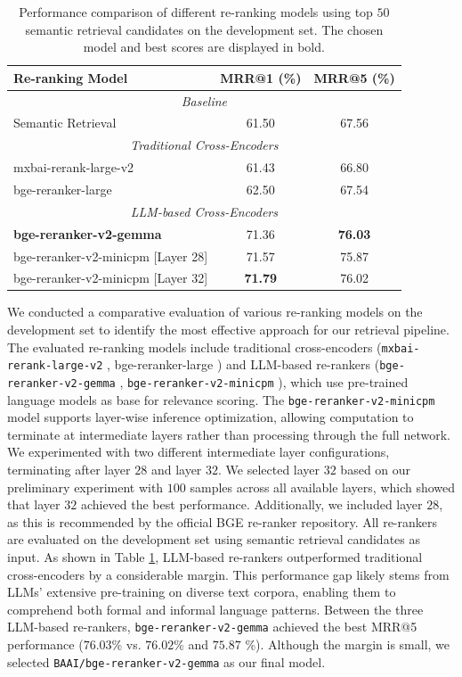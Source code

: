 \begin{table}[h]
\centering
\caption{Performance comparison of different re-ranking models using top $50$ semantic retrieval candidates on the development set. The chosen model and best scores are displayed in bold.}
\label{tab:reranker-comparison}
\begin{tabular}{lcc}
\toprule
\textbf{Re-ranking Model} & \textbf{MRR@1 (\%)} & \textbf{MRR@5 (\%)} \\
\midrule
\multicolumn{3}{c}{\textit{Baseline}} \\
\midrule
Semantic Retrieval & 61.50 & 67.56 \\
\midrule
\multicolumn{3}{c}{\textit{Traditional Cross-Encoders}} \\
\midrule
mxbai-rerank-large-v2 & 61.43 & 66.80 \\
bge-reranker-large & 62.50 & 67.54 \\
\midrule
\multicolumn{3}{c}{\textit{LLM-based Cross-Encoders}} \\
\midrule
\textbf{bge-reranker-v2-gemma} & 71.36 & \textbf{76.03} \\
bge-reranker-v2-minicpm [Layer 28] & 71.57 & 75.87 \\
bge-reranker-v2-minicpm [Layer 32]  & \textbf{71.79} & 76.02 \\
\bottomrule
\end{tabular}
\end{table}

We conducted a comparative evaluation of various re-ranking models on the development set to identify the most effective approach for our retrieval pipeline. The evaluated re-ranking models include traditional cross-encoders (\texttt{mxbai-rerank-large-v2} \cite{rerank2024mxbai}, bge-reranker-large \cite{bge_embedding}) and LLM-based re-rankers (\texttt{bge-reranker-v2-gemma} \cite{li_making_2023, chen_m3-embedding_2024}, \texttt{bge-reranker-v2-minicpm} \cite{li_making_2023, chen_m3-embedding_2024}), which use pre-trained language models as base for relevance scoring. The \texttt{bge-reranker-v2-minicpm} model supports layer-wise inference optimization, allowing computation to terminate at intermediate layers rather than processing through the full network.
We experimented with two different intermediate layer configurations, terminating after layer $28$ and layer $32$. We selected layer $32$ based on our preliminary experiment with $100$ samples across all available layers, which showed that layer $32$ achieved the best performance. Additionally, we included layer $28$, as this is recommended by the official BGE re-ranker repository. All re-rankers are evaluated on the development set using semantic retrieval candidates as input. As shown in Table \ref{tab:reranker-comparison}, LLM-based re-rankers outperformed traditional cross-encoders by a considerable margin. This performance gap likely stems from LLMs' extensive pre-training on diverse text corpora, enabling them to comprehend both formal and informal language patterns. Between the three LLM-based re-rankers, \texttt{bge-reranker-v2-gemma} achieved the best MRR@5 performance ($76.03$\% vs. $76.02$\% and $75.87$ \%). Although the margin is small, we selected \texttt{BAAI/bge-reranker-v2-gemma} as our final model.

